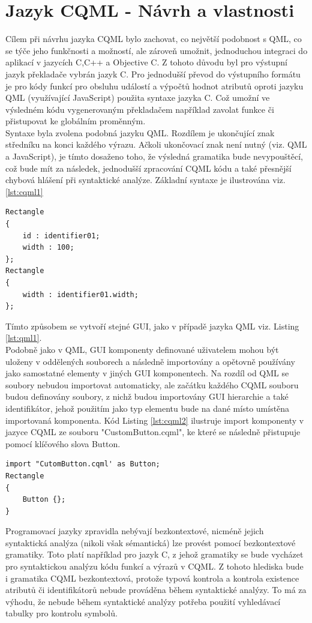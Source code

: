 \documentclass[report,11pt]{elsarticle}
\begin{document}
\section{\label{SEC:CQML}Jazyk CQML - Návrh a vlastnosti}
Cílem při návrhu jazyka CQML bylo zachovat, co největší podobnost s QML, co se týče jeho funkčnosti a možností, ale zároveň umožnit, jednoduchou integraci do aplikací v jazycích C,C++ a Objective C. Z tohoto důvodu byl pro výstupní jazyk překladače vybrán jazyk C. Pro jednodušší převod do výstupního formátu je pro kódy funkcí pro obsluhu událostí a výpočtů hodnot atributů oproti jazyku QML (využívající JavaScript) použita syntaxe jazyka C. Což umožní ve výsledném kódu vygenerovaným překladačem  například zavolat funkce či přistupovat ke globálním proměnným.\\
Syntaxe byla zvolena podobná jazyku QML. Rozdílem je ukončující znak středníku na konci každého výrazu. Ačkoli ukončovací znak není nutný (viz. QML a JavaScript), je tímto dosaženo toho, že výsledná gramatika bude nevypouštěcí, což bude mít za následek, jednodušší zpracování CQML kódu a také přesnější chybová hlášení při syntaktické analýze. Základní syntaxe je ilustrována viz. \ref{lst:cqml1}
\begin{lstlisting}[frame=single,caption=Tvorba dvou jednoduchých elementů pomocí jazyka CQML.,label=lst:cqml1]
Rectangle
{
	id : identifier01;
	width : 100;
};
Rectangle
{
	width : identifier01.width;
};
\end{lstlisting}
Tímto způsobem se vytvoří stejné GUI, jako v případě jazyka QML viz. Listing \ref{lst:qml1}.\\
Podobně jako v QML, GUI komponenty definované uživatelem mohou být uloženy v oddělených souborech a následně importovány a opětovně používány jako samostatné elementy v jiných GUI komponentech. Na rozdíl od QML se soubory nebudou importovat automaticky, ale začátku každého CQML souboru budou definovány soubory, z nichž budou importovány GUI hierarchie a také identifikátor, jehož použitím jako typ elementu bude na dané místo umístěna importovaná komponenta. Kód Listing \ref{lst:cqml2} ilustruje import komponenty v jazyce CQML ze souboru "CustomButton.cqml", ke které se následně přistupuje pomocí klíčového slova Button.
\begin{lstlisting}[frame=single,caption=Ukázka importu komponenty v jazyce CQML.,label=lst:cqml2]
import "CutomButton.cqml' as Button;
Rectangle
{
	Button {};
}
\end{lstlisting}
Programovací jazyky zpravidla nebývají bezkontextové, nicméně jejich syntaktická analýza (nikoli však sémantická) lze provést pomocí bezkontextové gramatiky. Toto platí například pro jazyk C, z jehož gramatiky se bude vycházet pro syntaktickou analýzu kódu funkcí a výrazů v CQML. Z tohoto hlediska bude i gramatika CQML bezkontextová, protože typová kontrola a kontrola existence atributů či identifikátorů nebude prováděna během syntaktické analýzy. To má za výhodu, že nebude během syntaktické analýzy potřeba použití vyhledávací tabulky pro kontrolu symbolů.\\
\end{document}
